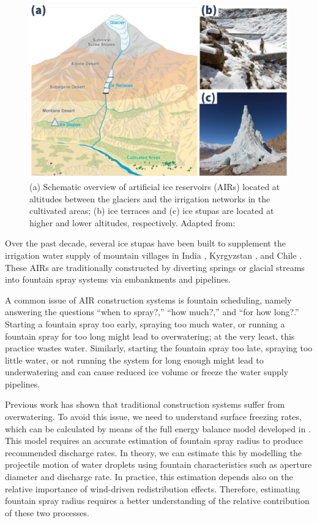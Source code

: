 \documentclass[tc, manuscript]{copernicus}
\begin{document}
\begin{figure}[htb]
\includegraphics[width=12cm]{Figures/AIR_forms.jpg}

\caption{(a) Schematic overview of artificial ice reservoirs (AIRs) located at
altitudes between the glaciers and the irrigation networks in the cultivated areas; (b) ice terraces and (c) ice
stupas are located at higher and lower altitudes, respectively. Adapted from:
\cite{nusserLocalKnowledgeGlobal2016}}

\label{fig:AIRforms}
\end{figure}

Over the past decade, several ice stupas have been built to supplement the irrigation water supply of mountain
villages in India \citep{wangchukIceStupaCompetition2020, palmerStoringFrozenWater2022,
aggarwalAdaptationClimateChange2021}, Kyrgyzstan \citep{bbcnewsBrightArtificialGlacier2020}, and Chile
\citep{reutersConservationistsChileAim2021}. These AIRs are traditionally constructed by diverting springs or
glacial streams into fountain spray systems via embankments and pipelines. 

A common issue of AIR construction systems is fountain scheduling, namely answering the questions “when to spray?,” “how much?,” and “for how long?.”
Starting a fountain spray too early, spraying too much water, or running a fountain spray for too long might lead to
overwatering; at the very least, this practice wastes water. Similarly, starting the fountain spray too late,
spraying too little water, or not running the system for long enough might lead to underwatering and can cause
reduced ice volume or freeze the water supply pipelines.

Previous work \citep{balasubramanianInfluenceMeteorologicalConditions2022} has shown that traditional
construction systems suffer from overwatering. To avoid this issue, we need to understand
surface freezing rates, which can be calculated by means of the full energy balance model developed in
\cite{balasubramanianInfluenceMeteorologicalConditions2022}. This model requires an accurate estimation of
fountain spray radius to produce recommended discharge rates. In theory, we can estimate this by
modelling the projectile motion of water droplets using fountain characteristics such as aperture diameter and
discharge rate. In practice, this estimation depends also on the relative importance of wind-driven
redistribution effects. Therefore, estimating fountain spray radius
requires a better understanding of the relative contribution of these two processes.
\end{document}
